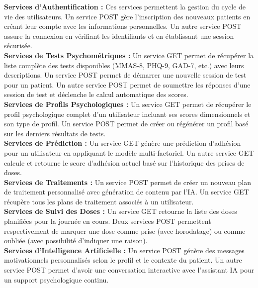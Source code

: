 \documentclass[12pt,a4paper]{report}
\begin{document}
\textbf{Services d'Authentification :} Ces services permettent la gestion du cycle de vie des utilisateurs. Un service POST gère l'inscription des nouveaux patients en créant leur compte avec les informations personnelles. Un autre service POST assure la connexion en vérifiant les identifiants et en établissant une session sécurisée. \\

\textbf{Services de Tests Psychométriques :} Un service GET permet de récupérer la liste complète des tests disponibles (MMAS-8, PHQ-9, GAD-7, etc.) avec leurs descriptions. Un service POST permet de démarrer une nouvelle session de test pour un patient. Un autre service POST permet de soumettre les réponses d'une session de test et déclenche le calcul automatique des scores. \\

\textbf{Services de Profils Psychologiques :} Un service GET permet de récupérer le profil psychologique complet d'un utilisateur incluant ses scores dimensionnels et son type de profil. Un service POST permet de créer ou régénérer un profil basé sur les derniers résultats de tests. \\

\textbf{Services de Prédiction :} Un service GET génère une prédiction d'adhésion pour un utilisateur en appliquant le modèle multi-factoriel. Un autre service GET calcule et retourne le score d'adhésion actuel basé sur l'historique des prises de doses. \\

\textbf{Services de Traitements :} Un service POST permet de créer un nouveau plan de traitement personnalisé avec génération de contenu par l'IA. Un service GET récupère tous les plans de traitement associés à un utilisateur. \\

\textbf{Services de Suivi des Doses :} Un service GET retourne la liste des doses planifiées pour la journée en cours. Deux services POST permettent respectivement de marquer une dose comme prise (avec horodatage) ou comme oubliée (avec possibilité d'indiquer une raison). \\

\textbf{Services d'Intelligence Artificielle :} Un service POST génère des messages motivationnels personnalisés selon le profil et le contexte du patient. Un autre service POST permet d'avoir une conversation interactive avec l'assistant IA pour un support psychologique continu. \\
\end{document}
